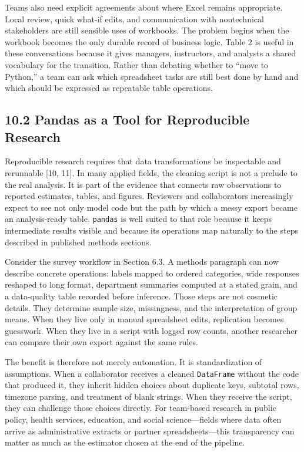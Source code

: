 \documentclass[
  12pt,
]{article}
\begin{document}
Teams also need explicit agreements about where Excel remains
appropriate. Local review, quick what-if edits, and communication with
nontechnical stakeholders are still sensible uses of workbooks. The
problem begins when the workbook becomes the only durable record of
business logic. Table 2 is useful in these conversations because it
gives managers, instructors, and analysts a shared vocabulary for the
transition. Rather than debating whether to ``move to Python,'' a team
can ask which spreadsheet tasks are still best done by hand and which
should be expressed as repeatable table operations.

\subsection{10.2 Pandas as a Tool for Reproducible
Research}\label{pandas-as-a-tool-for-reproducible-research}

Reproducible research requires that data transformations be inspectable
and rerunnable {[}10, 11{]}. In many applied fields, the cleaning script
is not a prelude to the real analysis. It is part of the evidence that
connects raw observations to reported estimates, tables, and figures.
Reviewers and collaborators increasingly expect to see not only model
code but the path by which a messy export became an analysis-ready
table. \texttt{pandas} is well suited to that role because it keeps
intermediate results visible and because its operations map naturally to
the steps described in published methods sections.

Consider the survey workflow in Section 6.3. A methods paragraph can now
describe concrete operations: labels mapped to ordered categories, wide
responses reshaped to long format, department summaries computed at a
stated grain, and a data-quality table recorded before inference. Those
steps are not cosmetic details. They determine sample size, missingness,
and the interpretation of group means. When they live only in manual
spreadsheet edits, replication becomes guesswork. When they live in a
script with logged row counts, another researcher can compare their own
export against the same rules.

The benefit is therefore not merely automation. It is standardization of
assumptions. When a collaborator receives a cleaned \texttt{DataFrame}
without the code that produced it, they inherit hidden choices about
duplicate keys, subtotal rows, timezone parsing, and treatment of blank
strings. When they receive the script, they can challenge those choices
directly. For team-based research in public policy, health services,
education, and social science---fields where data often arrive as
administrative extracts or partner spreadsheets---this transparency can
matter as much as the estimator chosen at the end of the pipeline.
\end{document}

